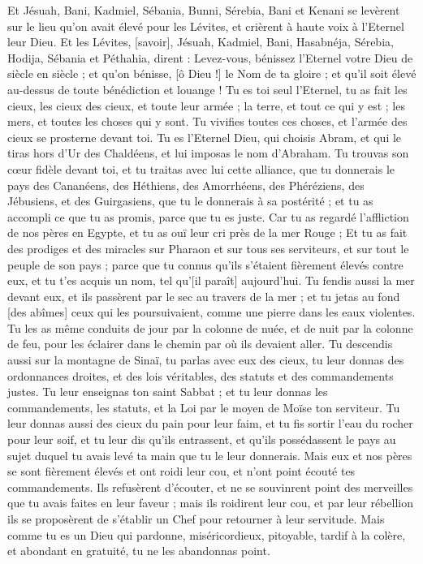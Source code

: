 \begin{multicols}{2}
Et Jésuah, Bani, Kadmiel, Sébania, Bunni, Sérebia, Bani et Kenani se levèrent sur le lieu qu'on avait élevé pour les Lévites, et crièrent à haute voix à l'Eternel leur Dieu.
Et les Lévites, [savoir], Jésuah, Kadmiel, Bani, Hasabnéja, Sérebia, Hodija, Sébania et Péthahia, dirent : Levez-vous, bénissez l'Eternel votre Dieu de siècle en siècle ; et qu'on bénisse, [ô Dieu !] le Nom de ta gloire ; et qu'il soit élevé au-dessus de toute bénédiction et louange !
Tu es toi seul l'Eternel, tu as fait les cieux, les cieux des cieux, et toute leur armée ; la terre, et tout ce qui y est ; les mers, et toutes les choses qui y sont. Tu vivifies toutes ces choses, et l'armée des cieux se prosterne devant toi.
Tu es l'Eternel Dieu, qui choisis Abram, et qui le tiras hors d'Ur des Chaldéens, et lui imposas le nom d'Abraham.
Tu trouvas son cœur fidèle devant toi, et tu traitas avec lui cette alliance, que tu donnerais le pays des Cananéens, des Héthiens, des Amorrhéens, des Phéréziens, des Jébusiens, et des Guirgasiens, que tu le donnerais à sa postérité ; et tu as accompli ce que tu as promis, parce que tu es juste.
Car tu as regardé l'affliction de nos pères en Egypte, et tu as ouï leur cri près de la mer Rouge ;
Et tu as fait des prodiges et des miracles sur Pharaon et sur tous ses serviteurs, et sur tout le peuple de son pays ; parce que tu connus qu'ils s'étaient fièrement élevés contre eux, et tu t'es acquis un nom, tel qu'[il paraît] aujourd'hui.
Tu fendis aussi la mer devant eux, et ils passèrent par le sec au travers de la mer ; et tu jetas au fond [des abîmes] ceux qui les poursuivaient, comme une pierre dans les eaux violentes.
Tu les as même conduits de jour par la colonne de nuée, et de nuit par la colonne de feu, pour les éclairer dans le chemin par où ils devaient aller.
Tu descendis aussi sur la montagne de Sinaï, tu parlas avec eux des cieux, tu leur donnas des ordonnances droites, et des lois véritables, des statuts et des commandements justes.
Tu leur enseignas ton saint Sabbat ; et tu leur donnas les commandements, les statuts, et la Loi par le moyen de Moïse ton serviteur.
Tu leur donnas aussi des cieux du pain pour leur faim, et tu fis sortir l'eau du rocher pour leur soif, et tu leur dis qu'ils entrassent, et qu'ils possédassent le pays au sujet duquel tu avais levé ta main que tu le leur donnerais.
Mais eux et nos pères se sont fièrement élevés et ont roidi leur cou, et n'ont point écouté tes commandements.
Ils refusèrent d'écouter, et ne se souvinrent point des merveilles que tu avais faites en leur faveur ; mais ils roidirent leur cou, et par leur rébellion ils se proposèrent de s'établir un Chef pour retourner à leur servitude. Mais comme tu es un Dieu qui pardonne, miséricordieux, pitoyable, tardif à la colère, et abondant en gratuité, tu ne les abandonnas point.

\end{multicols}
